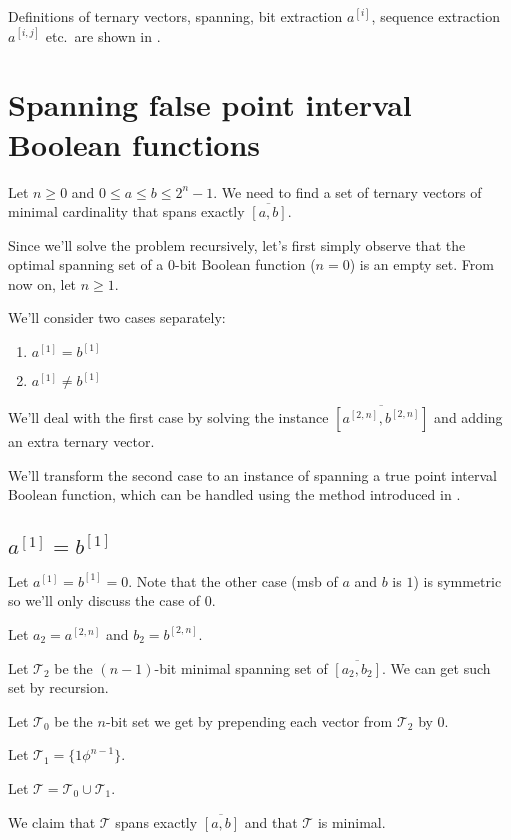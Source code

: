 \documentclass{article}
\theoremstyle{plain}
\theoremstyle{definition}
\newcommand{\interval}[2]{[#1, #2]}
\newcommand{\finterval}[2]{\overline{\interval{#1}{#2}}}
\newcommand{\bit}[2]{#1^{[#2]}}
\newcommand{\bits}[3]{#1^{\interval{#2}{#3}}}
\begin{document}
Definitions of
ternary vectors,
spanning,
bit extraction $\bit{a}{i}$,
sequence extraction $\bits{a}{i}{j}$
etc.~are shown in \cite{Schieber2005154}.

\section{Spanning false point interval Boolean functions}
Let $n \geq 0$ and $0 \leq a \leq b \leq 2^n - 1$.
We need to find a set of ternary vectors of minimal cardinality that spans exactly $\finterval{a}{b}$.

Since we'll solve the problem recursively,
let's first simply observe that the optimal spanning set of a $0$-bit Boolean function ($n = 0$)
is an empty set.
From now on, let $n \geq 1$.

We'll consider two cases separately:

\begin{enumerate}
\item $\bit{a}{1} = \bit{b}{1}$
\item $\bit{a}{1} \neq \bit{b}{1}$
\end{enumerate}

We'll deal with the first case by solving the instance $\finterval{\bits{a}{2}{n}}{\bits{b}{2}{n}}$
and adding an extra ternary vector.

We'll transform the second case to an instance of spanning a true point interval Boolean function,
which can be handled using the method introduced in \cite{Schieber2005154}.

\subsection{$\bit{a}{1} = \bit{b}{1}$}
Let $\bit{a}{1} = \bit{b}{1} = 0$.
Note that the other case (\acrshort{msb} of $a$ and $b$ is $1$)
is symmetric so we'll only discuss the case of $0$.

Let $a_2 = \bits{a}{2}{n}$ and $b_2 = \bits{b}{2}{n}$.

Let $\mathcal{T}_2$ be the $(n-1)$-bit minimal spanning set of $\finterval{a_2}{b_2}$.
We can get such set by recursion.

Let $\mathcal{T}_0$ be the $n$-bit set we get by prepending each vector from $\mathcal{T}_2$ by $0$.

Let $\mathcal{T}_1 = \{ 1 \phi^{n-1} \}$.

Let $\mathcal{T} = \mathcal{T}_0 \cup \mathcal{T}_1$.

We claim that $\mathcal{T}$ spans exactly $\finterval{a}{b}$
and that $\mathcal{T}$ is minimal.
\end{document}
